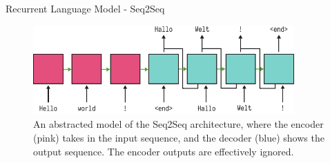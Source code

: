 \documentclass[aspectratio=169, 11pt]{beamer}
\begin{document}

\begin{frame}{Recurrent Language Model - Seq2Seq}
  \begin{figure}
  \centering
\includegraphics[width=100mm]{diagrams/seq2seq.pdf}
\caption{An abstracted model of the Seq2Seq architecture, where the encoder (pink) takes in the input sequence, and the decoder (blue) shows the output sequence. The encoder outputs are effectively ignored. \label{seq2seq_diagram}}
\end{figure}
\end{frame}
\end{document}
